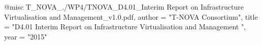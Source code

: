 @misc{ T_NOVA_./WP4/TNOVA_D4.01_Interim Report on Infrastructure Virtualisation and Management_v1.0.pdf,
       author = "{T-NOVA Consortium}",
       title = "D4.01 Interim Report on Infrastructure Virtualisation and Management ",
       year = "2015" }
